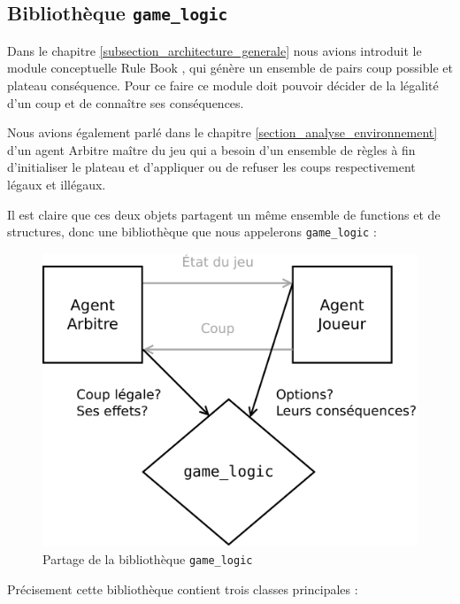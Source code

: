 
\subsection{Bibliothèque \texttt{\gls{game_logic}}}
Dans le chapitre \ref{subsection_architecture_generale} nous avions introduit le module conceptuelle \og Rule Book \fg{}, qui génère un ensemble de pairs coup possible et plateau conséquence. Pour ce faire ce module doit pouvoir décider de la légalité d'un coup et de connaître ses conséquences. 

Nous avions également parlé dans le chapitre \ref{section_analyse_environnement} d'un agent \og Arbitre \fg{} maître du jeu qui a besoin d'un ensemble de règles à fin d'initialiser le plateau et d'appliquer ou de refuser les coups respectivement légaux et illégaux.

Il est claire que ces deux objets partagent un même ensemble de functions et de structures, donc une bibliothèque que nous appelerons \texttt{game\_logic}  :

\begin{figure}[H] 
\centering
\includegraphics[width=\textwidth]{files/env/game_logic_shared} 
\caption{Partage de la bibliothèque \texttt{game\_logic}} 
\label{game_logic_shared}
\end{figure}

Précisement cette bibliothèque contient trois classes principales :

